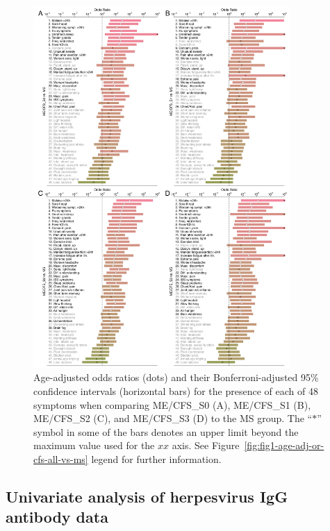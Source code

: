 \begin{figure}
    \centering
    \includegraphics[width=0.87\textwidth]{chapter/2023-sym-and-herpesvirus/figures/fig2-age-adj-or-cfs-other-vs-ms.png}
    \caption[Age-adjusted OR for the presence of each of 48 symptoms when comparing subgroups of ME/CFS to the MS group]{Age-adjusted odds ratios (dots) and their Bonferroni-adjusted 95\% confidence intervals (horizontal bars) for the presence of each of 48 symptoms when comparing ME/CFS\_S0 (A), ME/CFS\_S1 (B), ME/CFS\_S2 (C), and ME/CFS\_S3 (D) to the MS group. The ``${\ast}$'' symbol in some of the bars denotes an upper limit beyond the maximum value used for the $xx$ axis. See Figure~\ref{fig:fig1-age-adj-or-cfs-all-vs-ms} legend for further information.}
    \label{fig:fig2-age-adj-or-cfs-other-vs-ms}
\end{figure}

\clearpage

\subsection{Univariate analysis of herpesvirus IgG antibody data}

